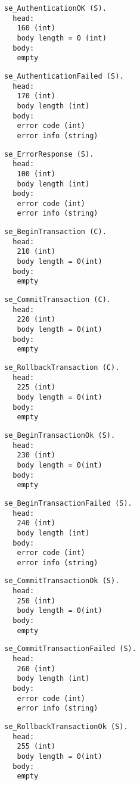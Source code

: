 \documentclass[a4paper,12pt]{article}
\begin{document}
\begin{verbatim}
se_AuthenticationOK (S).
  head:
   160 (int)
   body length = 0 (int)
  body:
   empty
\end{verbatim}

\begin{verbatim}
se_AuthenticationFailed (S).
  head:
   170 (int)
   body length (int)
  body:
   error code (int)
   error info (string)
\end{verbatim}

\begin{verbatim}
se_ErrorResponse (S).
  head:
   100 (int)
   body length (int)
  body:
   error code (int)
   error info (string)
\end{verbatim}

\begin{verbatim}
se_BeginTransaction (C).
  head:
   210 (int)
   body length = 0(int)
  body:
   empty
\end{verbatim}

\begin{verbatim}
se_CommitTransaction (C).
  head:
   220 (int)
   body length = 0(int)
  body:
   empty
\end{verbatim}

\begin{verbatim}
se_RollbackTransaction (C).
  head:
   225 (int)
   body length = 0(int)
  body:
   empty
\end{verbatim}

\begin{verbatim}
se_BeginTransactionOk (S).
  head:
   230 (int)
   body length = 0(int)
  body:
   empty
\end{verbatim}

\begin{verbatim}
se_BeginTransactionFailed (S).
  head:
   240 (int)
   body length (int)
  body:
   error code (int)
   error info (string)
\end{verbatim}

\begin{verbatim}
se_CommitTransactionOk (S).
  head:
   250 (int)
   body length = 0(int)
  body:
   empty
\end{verbatim}

\begin{verbatim}
se_CommitTransactionFailed (S).
  head:
   260 (int)
   body length (int)
  body:
   error code (int)
   error info (string)
\end{verbatim}

\begin{verbatim}
se_RollbackTransactionOk (S).
  head:
   255 (int)
   body length = 0(int)
  body:
   empty
\end{verbatim}
\end{document}

